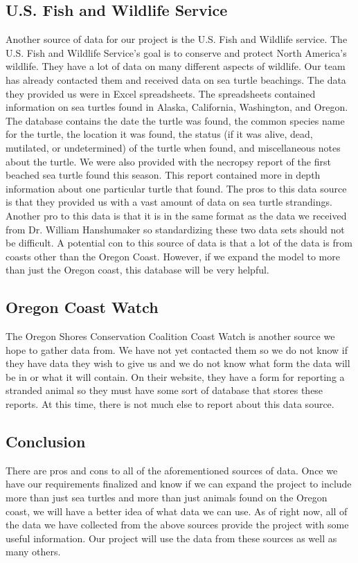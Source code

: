 \documentclass[onecolumn, draftclsnofoot,10pt, compsoc]{IEEEtran}
\begin{document}
\begin{singlespace}
\subsection{U.S. Fish and Wildlife Service}
Another source of data for our project is the U.S. Fish and Wildlife service. The U.S. Fish and Wildlife Service's goal is to conserve and protect North America's wildlife. They have a lot of data on many different aspects of wildlife. Our team has already contacted them and received data on sea turtle beachings. The data they provided us were in Excel spreadsheets. The spreadsheets contained information on sea turtles found in Alaska, California, Washington, and Oregon. The database contains the date the turtle was found, the common species name for the turtle, the location it was found, the status (if it was alive, dead, mutilated, or undetermined) of the turtle when found, and miscellaneous notes about the turtle. We were also provided with the necropsy report of the first beached sea turtle found this season. This report contained more in depth information about one particular turtle that found. The pros to this data source is that they provided us with a vast amount of data on sea turtle strandings. Another pro to this data is that it is in the same format as the data we received from Dr. William Hanshumaker so standardizing these two data sets should not be difficult. A potential con to this source of data is that a lot of the data is from coasts other than the Oregon Coast. However, if we expand the model to more than just the Oregon coast, this database will be very helpful.

\subsection{Oregon Coast Watch}
The Oregon Shores Conservation Coalition Coast Watch is another source we hope to gather data from. We have not yet contacted them so we do not know if they have data they wish to give us and we do not know what form the data will be in or what it will contain. On their website, they have a form for reporting a stranded animal so they must have some sort of database that stores these reports. At this time, there is not much else to report about this data source. 

\subsection{Conclusion}
There are pros and cons to all of the aforementioned sources of data. Once we have our requirements finalized and know if we can expand the project to include more than just sea turtles and more than just animals found on the Oregon coast, we will have a better idea of what data we can use. As of right now, all of the data we have collected from the above sources provide the project with some useful information. Our project will use the data from these sources as well as many others. 


\end{singlespace}
\end{document}
